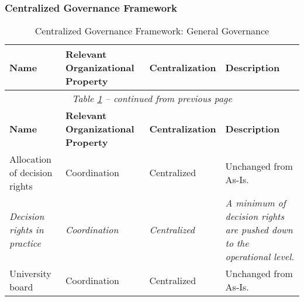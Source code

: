 
\subsubsection*{Centralized Governance Framework}


\begin{center}
\begin{longtable}{ | p{} | p{}| p{} | p{}|}
\caption{Centralized Governance Framework: General Governance} \label{table:centralGeneralGovernance} \\
%
\hline
\textbf{Name} & 
\textbf{Relevant Organizational Property} &
\textbf{Centralization} &  
\textbf{Description} \\ \hline
\endfirsthead
%
\multicolumn{4}{c}{\textit{Table \ref{table:centralGeneralGovernance} -- continued from previous page}} \\  
\hline
\textbf{Name} & 
\textbf{Relevant Organizational Property} &
\textbf{Centralization} &  
\textbf{Description} \\ \hline
\endhead
%
 Allocation of decision rights & 
 Coordination &
 Centralized & 
 Unchanged from As-Is. \\
%
\hline
%
 \textit{Decision rights in practice} & 
 \textit{Coordination} &
 \textit{Centralized} & 
 \textit{A minimum of decision rights are pushed down to the operational level.} \\
%
\hline
%
%
%
 University board &
 Coordination &
 Centralized &
 Unchanged from As-Is. \\
%
\hline
%
 

\end{longtable}
\end{center}
